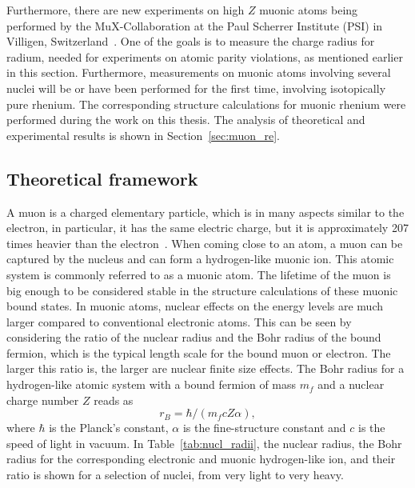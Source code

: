 Furthermore, there are new experiments on high $Z$ muonic atoms being performed by the MuX-Collaboration at the Paul Scherrer Institute (PSI) in Villigen, Switzerland~\cite{kirch2016}. One of the goals is to measure the charge radius for radium, needed for experiments on atomic parity violations, as mentioned earlier in this section. Furthermore, measurements on muonic atoms involving several nuclei will be or have been performed for the first time, involving isotopically pure rhenium. The corresponding structure calculations for muonic rhenium were performed during the work on this thesis. The analysis of theoretical and experimental results is shown in Section~\ref{sec:muon_re}.

\subsection{Theoretical framework}
\label{sec:muon_framework}
A muon is a charged elementary particle, which is in many aspects similar to the electron, in particular, it has the same electric charge, but it is approximately 207 times heavier than the electron~\cite{codata}. When coming close to an atom, a muon can be captured by the nucleus and can form a hydrogen-like muonic ion. This atomic system is commonly referred to as a muonic atom. The lifetime of the muon is big enough to be considered stable in the structure calculations of these muonic bound states.
In muonic atoms, nuclear effects on the energy levels are much larger compared to conventional electronic atoms. This can be seen by considering the ratio of the nuclear radius and the Bohr radius of the bound fermion, which is the typical length scale for the bound muon or electron. The larger this ratio is, the larger are nuclear finite size effects. The Bohr radius for a hydrogen-like atomic system with a bound fermion of mass $m_f$ and a nuclear charge number $Z$ reads as
\begin{equation}
r_B = \hbar / (m_f c Z \alpha),
\end{equation}
where $\hbar$ is the Planck's constant, $\alpha$ is the fine-structure constant and $c$ is the speed of light in vacuum. In Table~\ref{tab:nucl_radii}, the nuclear radius, the Bohr radius for the corresponding electronic and muonic hydrogen-like ion, and their ratio is shown for a selection of nuclei, from very light to very heavy.
%
%
